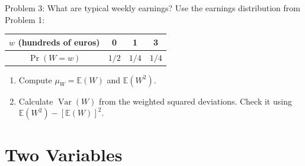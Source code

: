 \documentclass[notes,10pt, aspectratio=169]{beamer}
\newif\ifshowsolutions
\newcommand{\E}{\mathbb{E}}
\newcommand{\Var}{\operatorname{Var}}
\newcommand{\answerpart}[1]{\textcolor{blue}{\textbf{#1.}}\,}
\begin{document}
\begin{frame}{Problem 3: What are typical weekly earnings?}
Use the earnings distribution from Problem 1:
\begin{center}
\begin{tabular}{c|ccc}
$w$ (hundreds of euros) & 0 & 1 & 3 \\ \hline
$\Pr(W=w)$ & $1/2$ & $1/4$ & $1/4$
\end{tabular}
\end{center}
\begin{enumerate}
\setlength{\itemsep}{7pt}
\item Compute $\mu_W=\E(W)$ and $\E(W^2)$.
\item Calculate $\Var(W)$ from the weighted squared deviations. Check it using $\E(W^2)-[\E(W)]^2$.
\end{enumerate}
\end{frame}

\ifshowsolutions
\begin{frame}{Solution 3: Average earnings and variance}
\small
\answerpart{1}
\[
\E(W)=\tfrac12(0)+\tfrac14(1)+\tfrac14(3)=1,
\qquad \E(W^2)=\tfrac14(1)+\tfrac14(9)=\tfrac52.
\]
\answerpart{2}
\begin{columns}[T]
\begin{column}{.48\textwidth}
\textbf{Weighted squared deviations}
\begin{align*}
\Var(W)&=\tfrac12(0-1)^2+\tfrac14(1-1)^2\\
&\quad+\tfrac14(3-1)^2\\
&=\tfrac12+0+1=\boxed{\tfrac32}.
\end{align*}
\end{column}
\begin{column}{.48\textwidth}
\textbf{Second-moment shortcut}
\begin{align*}
\Var(W)&=\E(W^2)-[\E(W)]^2\\
&=\tfrac52-1^2=\boxed{\tfrac32}.
\end{align*}
\end{column}
\end{columns}
\end{frame}
\fi

\section{Two Variables}
\end{document}
